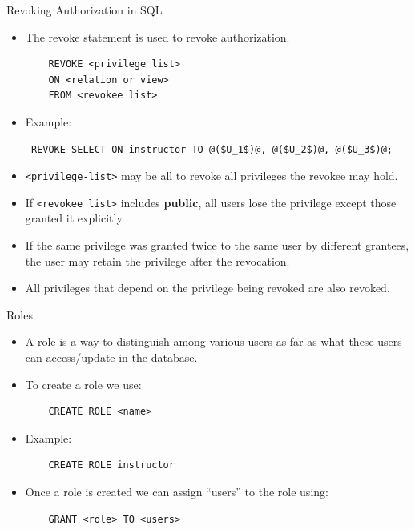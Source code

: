 \documentclass[aspectratio=169]{beamer}
\begin{document}
\begin{frame}[fragile]{Revoking Authorization in SQL}
    \begin{itemize}
        \item The revoke statement is used to revoke authorization.
            \begin{verbatim}
    REVOKE <privilege list>
    ON <relation or view>
    FROM <revokee list>
            \end{verbatim}
        \item Example:
            \begin{lstlisting}
 REVOKE SELECT ON instructor TO @($U_1$)@, @($U_2$)@, @($U_3$)@;
            \end{lstlisting}
        \item \verb|<privilege-list>| may be all to revoke all privileges the revokee may hold.
        \item If \verb|<revokee list>| includes \textbf{public}, all users lose the privilege except those granted it explicitly.
        \item If the same privilege was granted twice to the same user by different grantees, the user may retain the privilege after the revocation.
        \item All privileges that depend on the privilege being revoked are also revoked.
    \end{itemize}
\end{frame}

\begin{frame}[fragile]{Roles}
    \begin{itemize}
        \item A role is a way to distinguish among various users as far as what these users can access/update in the database.
        \item To create a role we use:
            \begin{verbatim}
    CREATE ROLE <name>
            \end{verbatim}
        \item Example:
            \begin{verbatim}
    CREATE ROLE instructor
            \end{verbatim}
        \item Once a role is created we can assign ``users'' to the role using:
            \begin{verbatim}
    GRANT <role> TO <users>
            \end{verbatim}
    \end{itemize}
\end{frame}
\end{document}
